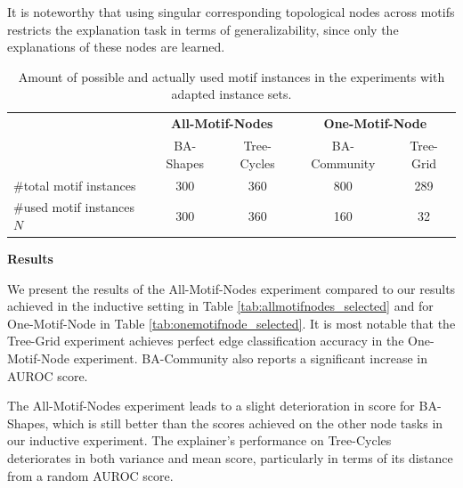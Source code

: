 It is noteworthy that using singular corresponding topological nodes across motifs restricts the explanation task in terms of generalizability, since only the explanations of these nodes are learned. %


\begin{table}[h]
    \centering
    \small
    \begin{tabular}{l|cc|cc}
    \multicolumn{1}{c}{\textbf{}} & \multicolumn{2}{c}{\textbf{All-Motif-Nodes}} & \multicolumn{2}{c}{\textbf{One-Motif-Node}} \\
    \addlinespace
    \textbf{} & BA-Shapes & Tree-Cycles & BA-Community & Tree-Grid \\
    \hline
    \#total motif instances & 300 & 360 & 800 & 289 \\
    \#used motif instances $N$ & 300 & 360 & 160  & 32 \\
    \end{tabular}
    \caption[Statistics of adapted motif node instances]{Amount of possible and actually used motif instances in the experiments with adapted instance sets.}
    \label{tab:motif-statistics-exp}
\end{table}

\textbf{Results}\par
We present the results of the All-Motif-Nodes experiment compared to our results achieved in the inductive setting in Table \ref{tab:allmotifnodes_selected} and for One-Motif-Node in Table \ref{tab:onemotifnode_selected}. It is most notable that the Tree-Grid experiment achieves perfect edge classification accuracy in the One-Motif-Node experiment. BA-Community also reports a significant increase in AUROC score.

The All-Motif-Nodes experiment leads to a slight deterioration in score for BA-Shapes, which is still better than the scores achieved on the other node tasks in our inductive experiment. The explainer's performance on Tree-Cycles deteriorates in both variance and mean score, particularly in terms of its distance from a random AUROC score.


